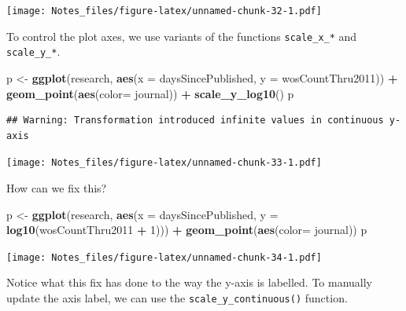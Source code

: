 \documentclass[
]{book}
\newenvironment{Shaded}{\begin{snugshade}}{\end{snugshade}}
\newcommand{\DataTypeTok}[1]{\textcolor[rgb]{0.13,0.29,0.53}{#1}}
\newcommand{\DecValTok}[1]{\textcolor[rgb]{0.00,0.00,0.81}{#1}}
\newcommand{\KeywordTok}[1]{\textcolor[rgb]{0.13,0.29,0.53}{\textbf{#1}}}
\newcommand{\NormalTok}[1]{#1}
\newcommand{\OperatorTok}[1]{\textcolor[rgb]{0.81,0.36,0.00}{\textbf{#1}}}
\newcommand{\StringTok}[1]{\textcolor[rgb]{0.31,0.60,0.02}{#1}}
\begin{document}
\texttt{[image: Notes\_files/figure-latex/unnamed-chunk-32-1.pdf]}

To control the plot axes, we use variants of the functions \texttt{scale\_x\_*} and \texttt{scale\_y\_*}.

\begin{Shaded}
\begin{Highlighting}[]
\NormalTok{p <-}\StringTok{ }\KeywordTok{ggplot}\NormalTok{(research, }\KeywordTok{aes}\NormalTok{(}\DataTypeTok{x =}\NormalTok{ daysSincePublished, }
                          \DataTypeTok{y =}\NormalTok{ wosCountThru2011)) }\OperatorTok{+}\StringTok{ }
\StringTok{  }\KeywordTok{geom_point}\NormalTok{(}\KeywordTok{aes}\NormalTok{(}\DataTypeTok{color=}\NormalTok{ journal)) }\OperatorTok{+}
\StringTok{  }\KeywordTok{scale_y_log10}\NormalTok{()}
\NormalTok{p}
\end{Highlighting}
\end{Shaded}

\begin{verbatim}
## Warning: Transformation introduced infinite values in continuous y-axis
\end{verbatim}

\texttt{[image: Notes\_files/figure-latex/unnamed-chunk-33-1.pdf]}

How can we fix this?

\begin{Shaded}
\begin{Highlighting}[]
\NormalTok{p <-}\StringTok{ }\KeywordTok{ggplot}\NormalTok{(research, }\KeywordTok{aes}\NormalTok{(}\DataTypeTok{x =}\NormalTok{ daysSincePublished, }
                          \DataTypeTok{y =} \KeywordTok{log10}\NormalTok{(wosCountThru2011 }\OperatorTok{+}\StringTok{ }\DecValTok{1}\NormalTok{))) }\OperatorTok{+}\StringTok{ }
\StringTok{  }\KeywordTok{geom_point}\NormalTok{(}\KeywordTok{aes}\NormalTok{(}\DataTypeTok{color=}\NormalTok{ journal))}
\NormalTok{p}
\end{Highlighting}
\end{Shaded}

\texttt{[image: Notes\_files/figure-latex/unnamed-chunk-34-1.pdf]}

Notice what this fix has done to the way the y-axis is labelled. To manually update the axis label, we can use the \texttt{scale\_y\_continuous()} function.
\end{document}

